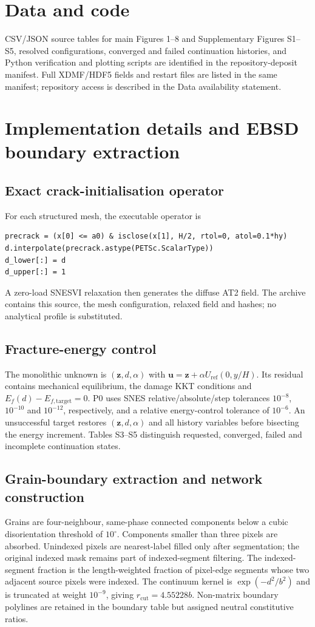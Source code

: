 \documentclass[review,12pt]{elsarticle}
\begin{document}
\section{Data and code}
\label{sec:supp-data}
CSV/JSON source tables for main Figures 1--8 and Supplementary Figures S1--S5,
resolved configurations, converged and failed continuation histories, and Python
verification and plotting scripts are identified in the repository-deposit
manifest. Full XDMF/HDF5 fields and restart files are listed in the same manifest;
repository access is described in the Data availability statement.
\section{Implementation details and EBSD boundary extraction}
\label{sec:supp-operators}

\subsection{Exact crack-initialisation operator}
For each structured mesh, the executable operator is
\begin{verbatim}
precrack = (x[0] <= a0) & isclose(x[1], H/2, rtol=0, atol=0.1*hy)
d.interpolate(precrack.astype(PETSc.ScalarType))
d_lower[:] = d
d_upper[:] = 1
\end{verbatim}
A zero-load SNESVI relaxation then generates the diffuse AT2 field. The archive
contains this source, the mesh configuration, relaxed field and hashes; no
analytical profile is substituted.

\subsection{Fracture-energy control}
The monolithic unknown is $(\mathbf{z},d,\alpha)$ with
$\mathbf{u}=\mathbf{z}+\alpha U_{\mathrm{ref}}(0,y/H)$. Its residual contains
mechanical equilibrium, the damage KKT conditions and
$E_f(d)-E_{f,\mathrm{target}}=0$. P0 uses SNES relative/absolute/step tolerances
$10^{-8}$, $10^{-10}$ and $10^{-12}$, respectively, and a relative energy-control
tolerance of $10^{-6}$. An unsuccessful target restores $(\mathbf{z},d,\alpha)$
and all history variables before bisecting the energy increment. Tables S3--S5 distinguish requested, converged, failed and incomplete
continuation states.

\subsection{Grain-boundary extraction and network construction}
Grains are four-neighbour, same-phase connected components below a cubic
disorientation threshold of $10^{\circ}$. Components smaller than three pixels
are absorbed. Unindexed pixels are nearest-label filled only after segmentation;
the original indexed mask remains part of indexed-segment filtering. The indexed-segment fraction is the
length-weighted fraction of pixel-edge segments whose two adjacent source pixels were
indexed. The continuum kernel is $\exp(-d^2/b^2)$ and is truncated at weight
$10^{-9}$, giving $r_{\mathrm{cut}}=4.55228b$. Non-matrix boundary polylines are retained in the boundary table but assigned neutral constitutive ratios.
\end{document}
